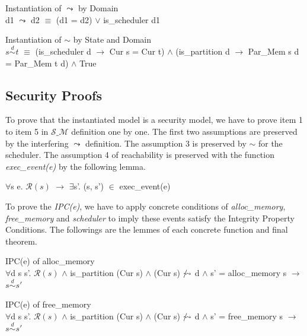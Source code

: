 \documentclass[runningheads]{llncs}
\makeatletter
\newcommand{\equidom}[3]{{#1}\stackrel{#2}{\sim}{#3}}
\newcommand{\superimpose}[2]
	{{\ooalign{$#1\@firstoftwo#2$\cr\hfil$#1\@secondoftwo#2$\hfil\cr}}}
\newcommand{\interf}{\leadsto}
\newcommand{\ninterf}{\mathrel{\mathpalette\superimpose{{\slash}{\leadsto}}}}
\makeatother
\begin{document}
\begin{definition} {Instantiation of $\interf$ by Domain} \\
d1 $\interf$ d2 $\equiv$ (d1 = d2) $\vee$ is\_scheduler d1
\end{definition}

\begin{definition} {Instantiation of $\sim$ by State and Domain} \\
$\equidom{s}{d}{t}$ $\equiv$ (is\_scheduler d $\longrightarrow$ Cur s = Cur t) $\wedge$ (is\_partition d $\longrightarrow$ Par\_Mem s d = Par\_Mem t d) $\wedge$ True
\end{definition}


\subsection{Security Proofs}

To prove that the instantiated model is a security model, we have to prove item 1 to item 5 in $\mathcal{S\_M}$ definition one by one. The first two assumptions are preserved by the interfering $\interf$ definition. The assumption 3 is preserved by $\sim$ for the scheduler. The assumption 4 of reachability is preserved with the function \textsl{exec\_event(e)} by the following lemma.

\begin{lemma}
$\forall$s e. $\mathcal{R}(s)$ $\longrightarrow$ $\exists$s'. (s, s') $\in$ exec\_event(e)
\end{lemma}

To prove the \textsl{IPC(e)}, we have to apply concrete conditions of \textsl{alloc\_memory}, \textsl{free\_memory} and \textsl{scheduler} to imply these events satisfy the Integrity Property Conditions. The followings are the lemmes of each concrete function and final theorem.

\begin{lemma} {IPC(e) of alloc\_memory} \\
$\forall$d s s'. $\mathcal{R}(s)$ $\wedge$ is\_partition (Cur s) $\wedge$ (Cur s) $\ninterf$ d $\wedge$ s' = alloc\_memory s $\longrightarrow$ $\equidom{s}{d}{s'}$
\end{lemma}

\begin{lemma} {IPC(e) of free\_memory} \\
$\forall$d s s'. $\mathcal{R}(s)$ $\wedge$ is\_partition (Cur s) $\wedge$ (Cur s) $\ninterf$ d $\wedge$ s' = free\_memory s $\longrightarrow$ $\equidom{s}{d}{s'}$
\end{lemma}
\end{document}
